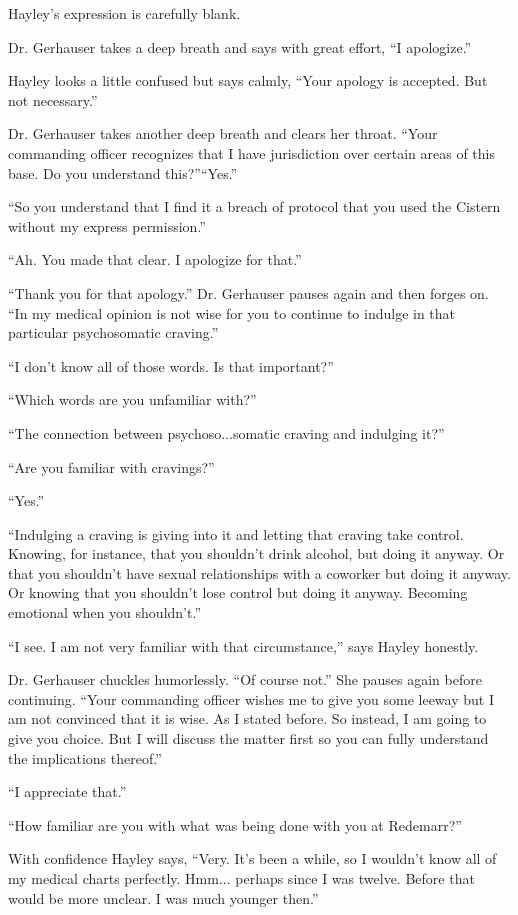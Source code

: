 Hayley's expression is carefully blank.

Dr. Gerhauser takes a deep breath and says with great effort, ``I apologize.''

Hayley looks a little confused but says calmly, ``Your apology is accepted.   But not necessary.''

Dr. Gerhauser takes another deep breath and clears her throat. ``Your commanding officer recognizes that I have jurisdiction over certain areas of this base.  Do you understand this?''``Yes.''

``So you understand that I find it a breach of protocol that you used the Cistern without my express permission.''

``Ah.  You made that clear.  I apologize for that.''

``Thank you for that apology.''  Dr. Gerhauser pauses again and then forges on. ``In my medical opinion is not wise for you to continue to indulge in that particular psychosomatic craving.''

``I don't know all of those words.  Is that important?''

``Which words are you unfamiliar with?''

``The connection between psychoso...somatic craving and indulging it?''

``Are you familiar with cravings?''

``Yes.''

``Indulging a craving is giving into it and letting that craving take control. Knowing, for instance, that you shouldn't drink alcohol, but doing it anyway.  Or that you shouldn't have sexual relationships with a coworker but doing it anyway.  Or knowing that you shouldn't lose control but doing it anyway.  Becoming emotional when you shouldn't.''

``I see.  I am not very familiar with that circumstance,'' says Hayley honestly.

Dr. Gerhauser chuckles humorlessly.  ``Of course not.''  She pauses again before continuing. ``Your commanding officer wishes me to give you some leeway but I am not convinced that it is wise.  As I stated before.  So instead, I am going to give you choice.  But I will discuss the matter first so you can fully understand the implications thereof.''

``I appreciate that.''

``How familiar are you with what was being done with you at Redemarr?''

With confidence Hayley says, ``Very.  It's been a while, so I wouldn't know all of my medical charts perfectly.  Hmm... perhaps since I was twelve.  Before that would be more unclear.  I was much younger then.''


